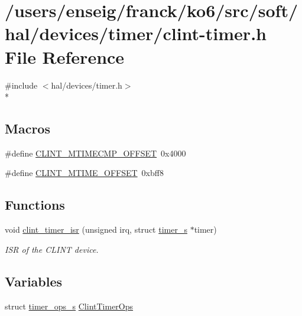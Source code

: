 \hypertarget{clint-timer_8h}{\section{/users/enseig/franck/ko6/src/soft/hal/devices/timer/clint-\/timer.h File Reference}
\label{clint-timer_8h}
}
{\ttfamily \#include $<$hal/devices/timer.\-h$>$}\\*
\subsection*{Macros}
\begin{DoxyCompactItemize}
\item 
\#define \hyperlink{clint-timer_8h_a2cd657f152580d1130d82d11d7289537}{C\-L\-I\-N\-T\-\_\-\-M\-T\-I\-M\-E\-C\-M\-P\-\_\-\-O\-F\-F\-S\-E\-T}~0x4000
\item 
\#define \hyperlink{clint-timer_8h_a7f71328bbc38b520ced165900a5f1c1f}{C\-L\-I\-N\-T\-\_\-\-M\-T\-I\-M\-E\-\_\-\-O\-F\-F\-S\-E\-T}~0xbff8
\end{DoxyCompactItemize}
\subsection*{Functions}
\begin{DoxyCompactItemize}
\item 
void \hyperlink{clint-timer_8h_ac4e214b8457c4aa41856f050aa3144e5}{clint\-\_\-timer\-\_\-isr} (unsigned irq, struct \hyperlink{structtimer__s}{timer\-\_\-s} $\ast$timer)
\begin{DoxyCompactList}\small\item\em I\-S\-R of the C\-L\-I\-N\-T device. \end{DoxyCompactList}\end{DoxyCompactItemize}
\subsection*{Variables}
\begin{DoxyCompactItemize}
\item 
struct \hyperlink{structtimer__ops__s}{timer\-\_\-ops\-\_\-s} \hyperlink{clint-timer_8h_ac6de9c7f0557ed4f63e96d7b02123a00}{Clint\-Timer\-Ops}
\end{DoxyCompactItemize}


